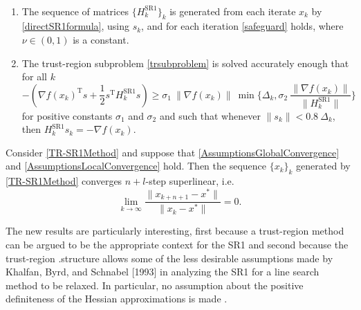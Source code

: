 \begin{assumption}\label{AssumptionsLocalConvergence} \ \\[-1.5\baselineskip]
    \begin{enumerate}
        \item The sequence of matrices $\{ H^{\mathrm{SR1}}_k \}_k$ is generated from each iterate $x_k$ by \cref{directSR1formula}, using $s_k$, and for each iteration \cref{safeguard} holds, where $\nu \in (0, 1)$ is a constant.
        \item The trust-region subproblem \cref{trsubproblem} is solved accurately enough that for all $k$ \begin{equation*} -(\nabla f(x_k)^{\mathrm{T}} s + \frac{1}{2} s^{\mathrm{T}} H^{\mathrm{SR1}}_k s) \geq \sigma_1 \ \lVert \nabla f(x_k) \rVert \ \min \{ \Delta_k, \sigma_2 \ \frac{\lVert \nabla f(x_k) \rVert}{\lVert H^{\mathrm{SR1}}_k \rVert} \} \end{equation*} for positive constants $\sigma_1$ and $\sigma_2$ and such that whenever $\lVert s_k \rVert < 0.8 \ \Delta_k$, then $H^{\mathrm{SR1}}_k s_k = - \nabla f(x_k)$.
    \end{enumerate}
\end{assumption}

\begin{theorem} \label{LocalConvergence}
    Consider \cref{TR-SR1Method} and suppose that \cref{AssumptionsGlobalConvergence} and \cref{AssumptionsLocalConvergence} hold. Then the sequence $\{ x_k \}_k$ generated by \cref{TR-SR1Method} converges $n+l$-step superlinear, i.e. 
    \begin{equation}\label{n+1superlinear}
        \lim_{k \rightarrow \infty} \frac{\lVert x_{k+n+1} - x^* \rVert}{\lVert x_k - x^* \rVert} = 0.
    \end{equation}
\end{theorem}

The new results are particularly interesting, first because a trust-region method can be argued to be the appropriate context for the SR1 and second because the trust-region .structure allows some of the less desirable assumptions made by Khalfan, Byrd, and Schnabel [1993] in analyzing the SR1 for a line search method to be relaxed. In particular, no assumption about the positive definiteness of the Hessian approximations is made \cite[p.~1025]{ByrdKhalfanSchnabel:1996}.
